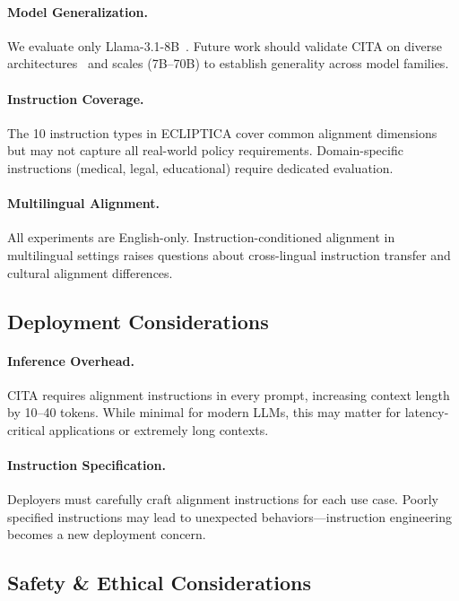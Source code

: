 \paragraph{Model Generalization.} We evaluate only Llama-3.1-8B~\cite{dubey2024llama}. Future work should validate CITA on diverse architectures~\cite{jiang2023mistral,zhang2022opt,openai2023gpt4} and scales (7B--70B) to establish generality across model families.

\paragraph{Instruction Coverage.} The 10 instruction types in ECLIPTICA cover common alignment dimensions but may not capture all real-world policy requirements. Domain-specific instructions (medical, legal, educational) require dedicated evaluation.

\paragraph{Multilingual Alignment.} All experiments are English-only. Instruction-conditioned alignment in multilingual settings raises questions about cross-lingual instruction transfer and cultural alignment differences.

\vspace{-2mm}
\subsection{Deployment Considerations}
\label{sec:deployment}

\paragraph{Inference Overhead.} CITA requires alignment instructions in every prompt, increasing context length by 10--40 tokens. While minimal for modern LLMs, this may matter for latency-critical applications or extremely long contexts.

\paragraph{Instruction Specification.} Deployers must carefully craft alignment instructions for each use case. Poorly specified instructions may lead to unexpected behaviors---instruction engineering becomes a new deployment concern.

\vspace{-2mm}
\subsection{Safety \& Ethical Considerations}
\label{sec:safety_ethics}

